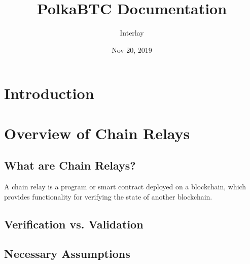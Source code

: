 \documentclass[letterpaper,10pt,english]{sphinxmanual}
\title{PolkaBTC Documentation}
\date{Nov 20, 2019}
\author{Interlay}
\begin{document}
\pagestyle{empty}
\sphinxmaketitle
\pagestyle{plain}
\sphinxtableofcontents
\pagestyle{normal}
\label{\detokenize{index::doc}}



\chapter{Introduction}
\label{\detokenize{introduction:introduction}}\label{\detokenize{introduction::doc}}

\chapter{Overview of Chain Relays}
\label{\detokenize{chain-relays:overview-of-chain-relays}}\label{\detokenize{chain-relays::doc}}

\section{What are Chain Relays?}
\label{\detokenize{chain-relays:what-are-chain-relays}}
A chain relay is a program or smart contract deployed on a blockchain, which
provides functionality for verifying the state of another blockchain.


\section{Verification vs. Validation}
\label{\detokenize{chain-relays:verification-vs-validation}}

\section{Necessary Assumptions}
\label{\detokenize{chain-relays:necessary-assumptions}}
\end{document}

